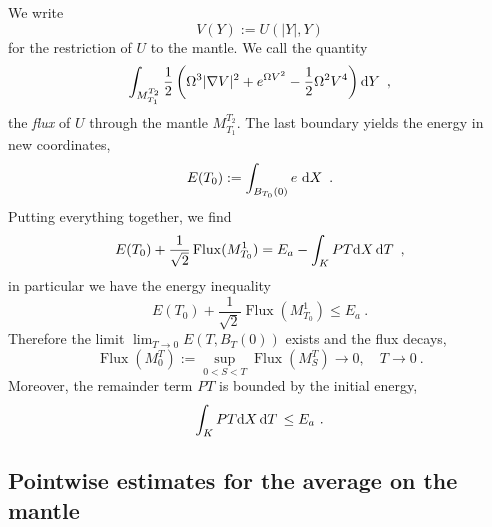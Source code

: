 \documentclass[a4paper]{amsart}
\providecommand{\abs}[1]{\lvert #1 \rvert}
\providecommand{\dint}[1]{ {\rm d} #1\,}
\begin{document}
We write
\begin{equation*}
  V(Y) := U(\abs{Y}, Y)
\end{equation*}
for the restriction of $U$ to the mantle. We call the quantity
\begin{equation*}
  \int_{M_{T_1}^{T_2}}
  \frac{1}{2}
  \left(
  \Omega^3 \abs{\nabla V}^2
  +
  e^{\Omega V^2} - \frac{1}{2} \Omega^2 V^4
  \right)
  \dint{Y} \ ,
\end{equation*}
the \textit{flux} of $U$ through the mantle $M_{T_1}^{T_2}$. The last
boundary yields the energy in new coordinates,
\begin{equation*}
  E(T_0) := \int_{B_{T_0}(0)} e\ \dint{X} \ .
\end{equation*}
Putting everything together, we find
\begin{equation*}
  E(T_0) + \frac{1}{\sqrt{2}} \operatorname{Flux}(M_{T_0}^{1})
  =
  E_a - \int_{K} P T \dint{X} \dint{T} \ ,
\end{equation*}
in particular we have the energy inequality
\begin{equation*}
  E(T_0) + \frac{1}{\sqrt{2}} \operatorname{Flux}(M_{T_0}^{1})
  \leq
  E_a \ .
\end{equation*}
Therefore the limit $\lim_{T \to 0} E(T,B_T(0))$ exists and the flux
decays,
\begin{equation}
  \operatorname{Flux}(M_0^T) := \sup_{0 < S < T} \operatorname{Flux}(M_S^T) \to 0, \quad
  T \to 0 \ .
  \label{eq:fluxdecay}
\end{equation}
Moreover, the remainder term $PT$ is bounded by the initial energy,
\begin{equation}
  \int_{K} P T \dint{X} \dint{T} \leq E_a \ .
  \label{eq:nonlinearremainderisbounded}
\end{equation}

\subsection{Pointwise estimates for the average on the mantle}
\end{document}
